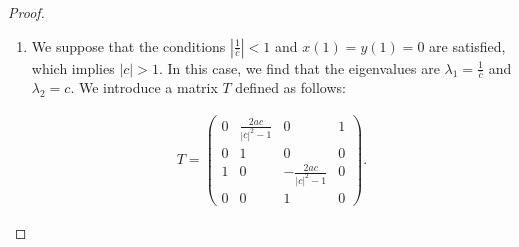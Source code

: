 \documentclass[10pt,a4paper]{amsart}
\begin{document}
\begin{proof}
\begin{enumerate}
    and we compute the \(l^2\)-norm of \(T^{-1} \psi\) as:

    \begin{align*}
    \| T^{-1} \psi \|^2 = \sum_{n \in \mathbb{N}} \left( |c|^{2n} \big( |x(n)|^2 + |y(n)|^2 \big) + \left| \frac{1}{\bar{c}} \right|^{2n} \big( |z(n)|^2 + |w(n)|^2 \big) \right).
    \end{align*}

    Since \(|\lambda_1| |\lambda_2| = 1\) and \(|c| < 1\), we conclude that \(\| T^{-1} \psi \|^2 < \infty\) holds if and only if either \(z(1) = w(1) = 0\) or both \(x(1) = y(1) = 0\) and \(\left| \frac{1}{\bar{c}} \right| < 1\).

    \begin{enumerate}
        \item We suppose that \(z(1) = w(1) = 0\) holds. Since \(w(1) = w \frac{2a}{|c|^2 - 1} = 0\), we deduce that either \(w = 0\) or \(a = 0\). Therefore, we determine that the kernel of \(H^\# - E\) is:

        \begin{align*}
        \ker(H^\# - E) =
        \begin{cases}
        \langle e_1 \rangle & \text{if } a \neq 0, \\
        \langle e_1, e_4 \rangle & \text{if } a = 0.
        \end{cases}
        \end{align*}

        \item We suppose that \(\left| \frac{1}{\bar{c}} \right| < 1\) and \(x(1) = y(1) = 0\) hold. Since \(\left| \frac{1}{\bar{c}} \right| < 1\) implies \(|c| > 1\), we recognize that this contradicts the assumption \(|c| < 1\) in this case.
    \end{enumerate}

    \item We suppose that the conditions \(\left| \frac{1}{\bar{c}} \right| < 1\) and \(x(1) = y(1) = 0\) are satisfied, which implies \(|c| > 1\). In this case, we find that the eigenvalues are \(\lambda_1 = \frac{1}{\bar{c}}\) and \(\lambda_2 = c\). We introduce a matrix \(T\) defined as follows:

    \begin{align*}
    T = \begin{pmatrix}
    0 & \frac{2a c}{|c|^2 - 1} & 0 & 1 \\
    0 & 1 & 0 & 0 \\
    1 & 0 & -\frac{2a c}{|c|^2 - 1} & 0 \\
    0 & 0 & 1 & 0
    \end{pmatrix}.
    \end{align*}


\end{enumerate}
\end{proof}
\end{document}
